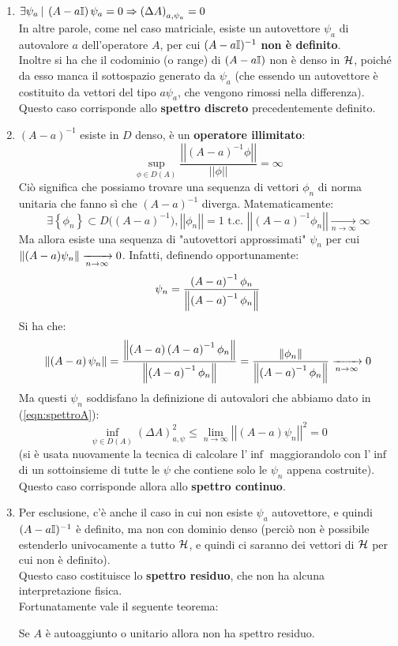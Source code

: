 \begin{enumerate}
    \item 
    $\displaystyle \exists  \psi_a\>|\> \left(A-a  \mathbb{I}\right)\psi_a=0\Rightarrow \left(\Delta A\right)_{a,\psi_a}=0$\\
    In altre parole, come nel caso matriciale, esiste un autovettore $\psi_a$ di autovalore $a$ dell'operatore $A$, per cui $(A-a\mathbb{I})^{-1}$ \textbf{non è definito}.\\
    Inoltre si ha che il codominio (o range) di $(A-a\mathbb{I})$  non è denso in $\mathcal{H}$, poiché da esso manca il sottospazio generato da $\psi_a$ (che essendo un autovettore è costituito da vettori del tipo $a\psi_a$, che vengono rimossi nella differenza).\\
    Questo caso corrisponde allo \textbf{spettro discreto} precedentemente definito.
	\item $\left(A-a\right)^{-1}$ esiste in $D$ denso, è un \textbf{operatore illimitato}:
	\[
	\sup_{\phi\in D\left(A\right)}{\frac{\left|\left|\left(A-a\right)^{-1}\phi\right|\right|}{\left|\left|\phi\right|\right|}}=\infty 
	\]
	Ciò significa che possiamo trovare una sequenza di vettori $\phi_n$ di norma unitaria che fanno sì che $(A-a)^{-1}$ diverga. Matematicamente: 
	\[ 
	\exists \left\{\phi_n\right\}\subset D{(\left(A-a\right)}^{-1}), \left|\left|\phi_n\right|\right|=1 \text{ t.c. }\left|\left|\left(A-a\right)^{-1}\phi_n\right|\right|\xrightarrow[n\to\infty]{} \infty
	\]
	Ma allora esiste una sequenza di "autovettori approssimati" $\psi_n$ per cui $\left\lVert(A-a)\psi_n\right\rVert\xrightarrow[n\to\infty]{} 0$. Infatti, definendo opportunamente:
	\[
	\psi_n=\frac{\left(A-a\right)^{-1}\phi_n}{\left\lVert\left(A-a\right)^{-1}\phi_n\right\rVert}
	\]
	Si ha che:
	\[
	\left\lVert\left(A-a\right)\psi_n\right\rVert=\frac{\left\lVert\left(A-a\right)\left(A-a\right)^{-1}\phi_n\right\rVert}{\left\lVert\left(A-a\right)^{-1}\phi_n\right\rVert}=\frac{\left\lVert\phi_n\right\rVert}{\left\lVert\left(A-a\right)^{-1}\phi_n\right\rVert}\xrightarrow[n\to\infty]{} 0
	\]
	Ma questi $\psi_n$ soddisfano la definizione di autovalori che abbiamo dato in (\ref{eqn:spettroA}):
	\[
	\inf_{\psi\in D\left(A\right)}{\left(\Delta A\right)_{a,\psi}^2}\leq \lim_{n\rightarrow\infty}{\left|\left|\left(A-a\right)\psi_n\right|\right|^2=0}
	\]
	(si è usata nuovamente la tecnica di calcolare l'$\inf$ maggiorandolo con l'$\inf$ di un sottoinsieme di tutte le $\psi$ che contiene solo le $\psi_n$ appena costruite).\\
	Questo caso corrisponde allora allo \textbf{spettro continuo}.
	\item Per esclusione, c'è anche il caso in cui non esiste $\psi_a$ autovettore, e quindi $(A-a\mathbb{I})^{-1}$ è definito, ma non con dominio denso (perciò non è possibile estenderlo univocamente a tutto $\mathcal{H}$, e quindi ci saranno dei vettori di $\mathcal{H}$ per cui non è definito).\\
	Questo caso costituisce lo \textbf{spettro residuo}, che non ha alcuna interpretazione fisica.\\
	Fortunatamente vale il seguente teorema:
	\begin{thm}
	Se $A$ è autoaggiunto o unitario allora non ha spettro residuo.
	\end{thm}
\end{enumerate}

